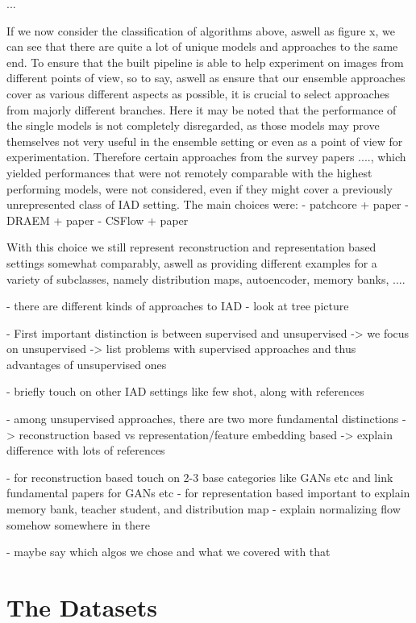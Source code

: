 ... 


If we now consider the classification of algorithms above, aswell as figure x, we can see that there are quite a lot of unique models and approaches to the same end. To ensure that the built 
pipeline is able to help experiment on images from different points of view, so to say, aswell as ensure that our ensemble approaches cover as various different aspects as possible, it is 
crucial to select approaches from majorly different branches. Here it may be noted that the performance of the single models is not completely disregarded, as those models may prove themselves 
not very useful in the ensemble setting or even as a point of view for experimentation. Therefore certain approaches from the survey papers ...., which yielded performances that were not 
remotely comparable with the highest performing models, were not considered, even if they might cover a previously unrepresented class of IAD setting. 
The main choices were:
- patchcore + paper
- DRAEM + paper
- CSFlow + paper

With this choice we still represent reconstruction and representation based settings somewhat comparably, aswell as providing different examples for a variety of subclasses, namely
distribution maps, autoencoder, memory banks, ....



- there are different kinds of approaches to IAD
- look at tree picture
 
- First important distinction is between supervised and unsupervised
-> we focus on unsupervised
-> list problems with supervised approaches and thus advantages of unsupervised ones

- briefly touch on other IAD settings like few shot, along with references

- among unsupervised approaches, there are two more fundamental distinctions
-> reconstruction based vs representation/feature embedding based
-> explain difference with lots of references

- for reconstruction based touch on 2-3 base categories like GANs etc and link fundamental papers for GANs etc
- for representation based important to explain memory bank, teacher student, and distribution map
- explain normalizing flow somehow somewhere in there

- maybe say which algos we chose and what we covered with that



\section{The Datasets}

